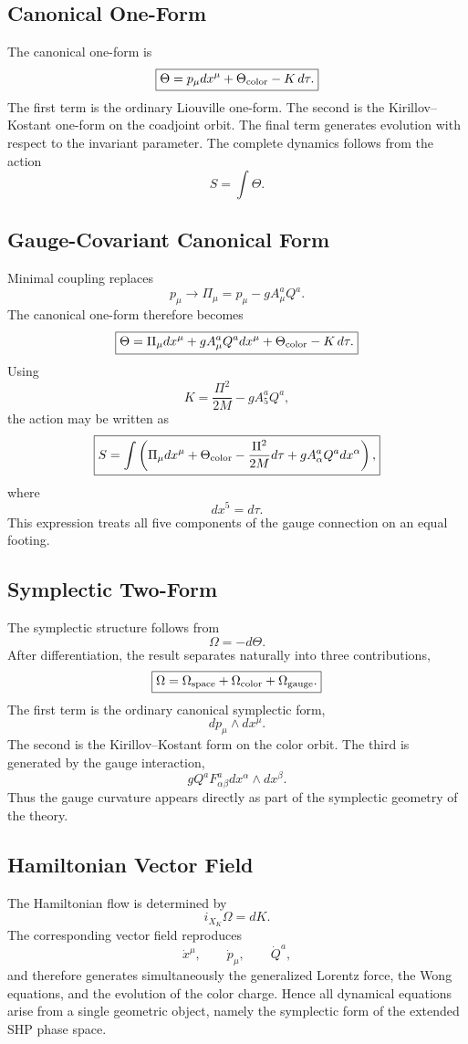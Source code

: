 \subsection{Canonical One-Form}
The canonical one-form is
\[\boxed{\Theta=p_\mu dx^\mu+\Theta_{\rm color}-K\,d\tau .}\]
The first term is the ordinary Liouville one-form.
The second is the Kirillov--Kostant one-form on the coadjoint orbit.
The final term generates evolution with respect to the invariant
parameter.
The complete dynamics follows from the action
\[S=\int\Theta.\]
\subsection{Gauge-Covariant Canonical Form}
Minimal coupling replaces
\[p_\mu\rightarrow\Pi_\mu=p_\mu-gA_\mu^aQ^a.\]
The canonical one-form therefore becomes
\[\boxed{\Theta=\Pi_\mu dx^\mu+gA_\mu^aQ^a dx^\mu+\Theta_{\rm color}-K\,d\tau .}\]
Using
\[K=\frac{\Pi^2}{2M}-gA_5^aQ^a,\]
the action may be written as
\[\boxed{S=\int\left(\Pi_\mu dx^\mu+\Theta_{\rm color}-\frac{\Pi^2}{2M}d\tau
+gA_\alpha^aQ^a dx^\alpha\right),}\]
where
\[dx^5=d\tau.\]
This expression treats all five components of the gauge connection on an
equal footing.
\subsection{Symplectic Two-Form}
The symplectic structure follows from
\[\Omega=-d\Theta .\]
After differentiation,
the result separates naturally into three contributions,
\[\boxed{\Omega=\Omega_{\rm space}+\Omega_{\rm color}+\Omega_{\rm gauge}.}\]
The first term is the ordinary canonical symplectic form,
\[dp_\mu\wedge dx^\mu.\]
The second is the Kirillov--Kostant form on the color orbit.
The third is generated by the gauge interaction,
\[gQ^aF_{\alpha\beta}^adx^\alpha\wedge dx^\beta.\]
Thus the gauge curvature appears directly as part of the symplectic
geometry of the theory.
\subsection{Hamiltonian Vector Field}
The Hamiltonian flow is determined by
\[i_{X_K}\Omega=dK.\]
The corresponding vector field reproduces
\[\dot x^\mu,\qquad\dot p_\mu,\qquad\dot Q^a,\]
and therefore generates simultaneously
the generalized Lorentz force,
the Wong equations,
and the evolution of the color charge.
Hence all dynamical equations arise from a single geometric object,
namely the symplectic form of the extended SHP phase space.
